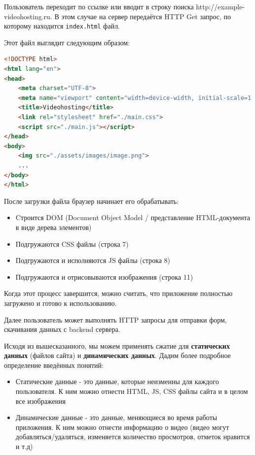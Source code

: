 \documentclass[12pt]{article}
\begin{document}
Пользователь переходит по ссылке или вводит в строку поиска http://example-videohosting.ru.
В этом случае на сервер передаётся HTTP Get запрос, по которому находится \verb|index.html| файл.

Этот файл выглядит следующим образом:

\begin{lstlisting}[language=HTML]
<!DOCTYPE html>
<html lang="en">
<head>
    <meta charset="UTF-8">
    <meta name="viewport" content="width=device-width, initial-scale=1.0">
    <title>Videohosting</title>
    <link rel="stylesheet" href="./main.css">
    <script src="./main.js"></script>
</head>
<body>
    <img src="./assets/images/image.png">
    ...
</body>
</html>
\end{lstlisting}

После загрузки файла браузер начинает его обрабатывать:

\begin{itemize}
    \item Cтроится DOM (Document Object Model / представление HTML-документа в виде дерева элементов)
    \item Подгружаются CSS файлы (строка 7)
    \item Подгружаются и исполняются JS файлы (строка 8)
    \item Подгружаются и отрисовываются изображения (строка 11)
\end{itemize}

Когда этот процесс завершится, можно считать, что приложение полностью загружено и готово к использованию.

Далее пользователь может выполнять HTTP запросы для отправки форм, скачивания данных с backend сервера.

Исходя из вышесказанного, мы можем применять сжатие для \textbf{статических данных} (файлов сайта)
и \textbf{динамических данных}. Дадим более подробное определение введённых понятий:

\begin{itemize}
    \item Статические данные - это данные, которые неизменны для каждого пользователя. К ним можно отнести HTML, JS, CSS файлы сайта и в целом все изображения
    \item Динамические данные - это данные, меняющиеся во время работы приложения.
          К ним можно отнести информацию о видео (видео могут добавляться/удаляться, изменяется количество просмотров, отметок нравится и т.д)
\end{itemize}
\end{document}
